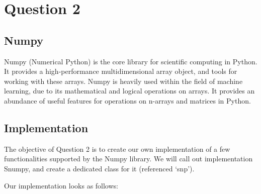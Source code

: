 \documentclass[11pt]{article}
\begin{document}
    \section{Question 2}\label{question-2}

\subsection{Numpy}\label{numpy}

Numpy (Numerical Python) is the core library for scientific computing in
Python. It provides a high-performance multidimensional array object,
and tools for working with these arrays. Numpy is heavily used within
the field of machine learning, due to its mathematical and logical
operations on arrays. It provides an abundance of useful features for
operations on n-arrays and matrices in Python.

\subsection{Implementation}\label{implementation}

    The objective of Question 2 is to create our own implementation of a few
functionalities supported by the Numpy library. We will call out
implementation Snumpy, and create a dedicated class for it (referenced
`snp').

Our implementation looks as follows:
\end{document}
